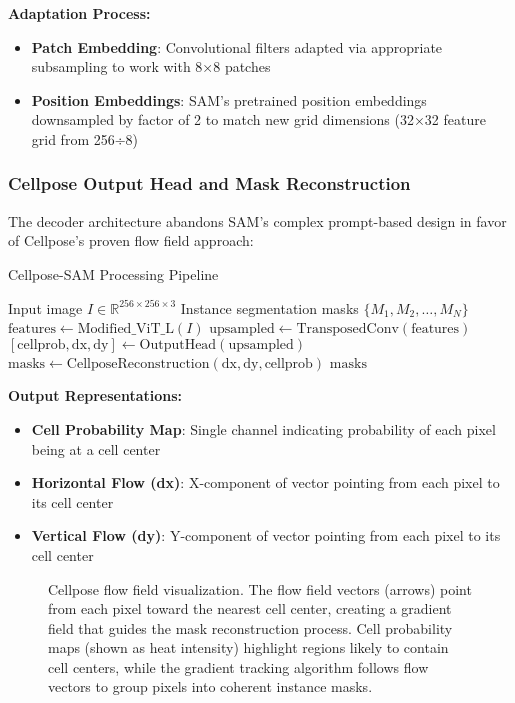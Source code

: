 \documentclass[../cellseek_paper.tex]{subfiles}
\begin{document}
\textbf{Adaptation Process:}
\begin{itemize}
  \item \textbf{Patch Embedding}: Convolutional filters adapted via appropriate subsampling to work with 8×8 patches
  \item \textbf{Position Embeddings}: SAM's pretrained position embeddings downsampled by factor of 2 to match new grid dimensions (32×32 feature grid from 256÷8)
\end{itemize}

\subsubsection{Cellpose Output Head and Mask Reconstruction}

The decoder architecture abandons SAM's complex prompt-based design in favor of Cellpose's proven flow field approach:

\begin{algorithm}[H]
  \caption{Cellpose-SAM Processing Pipeline}
  \begin{algorithmic}[1]
    \REQUIRE Input image $I \in \mathbb{R}^{256 \times 256 \times 3}$
    \ENSURE Instance segmentation masks $\{M_1, M_2, \ldots, M_N\}$
    \STATE $\text{features} \leftarrow \text{Modified\_ViT\_L}(I)$ 
    \STATE $\text{upsampled} \leftarrow \text{TransposedConv}(\text{features})$ 
    \STATE $[\text{cellprob}, \text{dx}, \text{dy}] \leftarrow \text{OutputHead}(\text{upsampled})$ 
    \STATE $\text{masks} \leftarrow \text{CellposeReconstruction}(\text{dx}, \text{dy}, \text{cellprob})$ 
    \RETURN $\text{masks}$
  \end{algorithmic}
\end{algorithm}

\textbf{Output Representations:}
\begin{itemize}
  \item \textbf{Cell Probability Map}: Single channel indicating probability of each pixel being at a cell center
  \item \textbf{Horizontal Flow (dx)}: X-component of vector pointing from each pixel to its cell center
  \item \textbf{Vertical Flow (dy)}: Y-component of vector pointing from each pixel to its cell center
\end{itemize}

\begin{figure}[h!]
  \centering
  
  \caption{Cellpose flow field visualization. The flow field vectors (arrows) point from each pixel toward the nearest cell center, creating a gradient field that guides the mask reconstruction process. Cell probability maps (shown as heat intensity) highlight regions likely to contain cell centers, while the gradient tracking algorithm follows flow vectors to group pixels into coherent instance masks.}
  \label{fig:flow_field}
\end{figure}
\end{document}
